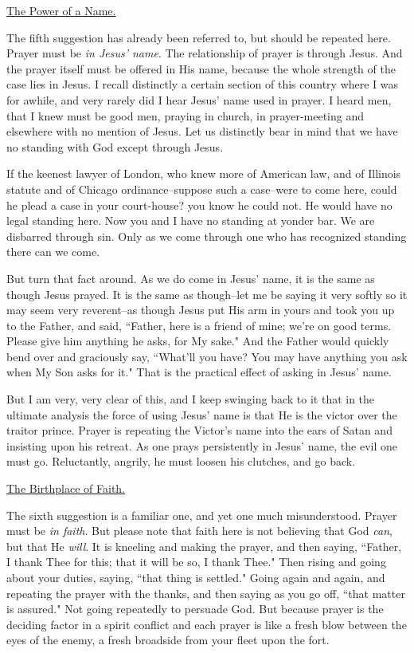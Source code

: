 \underline{The Power of a Name.}


The fifth suggestion has already been referred to, but should be repeated
here. Prayer must be \textit{in Jesus' name}. The relationship of prayer is
through Jesus. And the prayer itself must be offered in His name, because
the whole strength of the case lies in Jesus. I recall distinctly a
certain section of this country where I was for awhile, and very rarely
did I hear Jesus' name used in prayer. I heard men, that I knew must be
good men, praying in church, in prayer-meeting and elsewhere with no
mention of Jesus. Let us distinctly bear in mind that we have no standing
with God except through Jesus.

If the keenest lawyer of London, who knew more of American law, and of
Illinois statute and of Chicago ordinance--suppose such a case--were to
come here, could he plead a case in your court-house? you know he could
not. He would have no legal standing here. Now you and I have no standing
at yonder bar. We are disbarred through sin. Only as we come through one
who has recognized standing there can we come.

But turn that fact around. As we do come in Jesus' name, it is the same as
though Jesus prayed. It is the same as though--let me be saying it very
softly so it may seem very reverent--as though Jesus put His arm in yours
and took you up to the Father, and said, ``Father, here is a friend of
mine; we're on good terms. Please give him anything he asks, for My sake."
And the Father would quickly bend over and graciously say, ``What'll you
have? You may have anything you ask when My Son asks for it." That is the
practical effect of asking in Jesus' name.

But I am very, very clear of this, and I keep swinging back to it that in
the ultimate analysis the force of using Jesus' name is that He is the
victor over the traitor prince. Prayer is repeating the Victor's name into
the ears of Satan and insisting upon his retreat. As one prays
persistently in Jesus' name, the evil one must go. Reluctantly, angrily,
he must loosen his clutches, and go back.



\underline{The Birthplace of Faith.}


The sixth suggestion is a familiar one, and yet one much misunderstood.
Prayer must be \textit{in faith}. But please note that faith here is not
believing that God \textit{can}, but that He \textit{will}. It is kneeling and making
the prayer, and then saying, ``Father, I thank Thee for this; that it will
be so, I thank Thee." Then rising and going about your duties, saying,
``that thing is settled." Going again and again, and repeating the prayer
with the thanks, and then saying as you go off, ``that matter is assured."
Not going repeatedly to persuade God. But because prayer is the deciding
factor in a spirit conflict and each prayer is like a fresh blow between
the eyes of the enemy, a fresh broadside from your fleet upon the fort.

